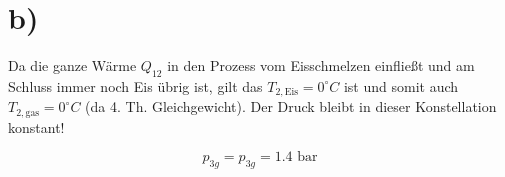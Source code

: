 

\section*{b)}

Da die ganze Wärme \(Q_{12}\) in den Prozess vom Eisschmelzen einfließt und am Schluss immer noch Eis übrig ist, gilt das \(T_{2, \text{Eis}} = 0^\circ C\) ist und somit auch \(T_{2, \text{gas}} = 0^\circ C\) (da 4. Th. Gleichgewicht). Der Druck bleibt in dieser Konstellation konstant!

\[ p_{3g} = p_{3g} = 1.4 \text{ bar} \]